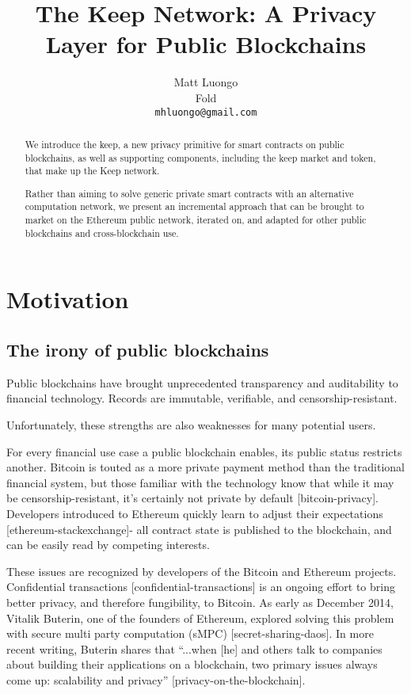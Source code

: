 \documentclass[11pt]{article}
\title{The Keep Network: A Privacy Layer for Public Blockchains}
\author{Matt Luongo \\
  Fold \\
  {\tt mhluongo@gmail.com}}
\date{}
\begin{document}
\maketitle
\begin{abstract}
  We introduce the keep, a new privacy primitive for smart contracts
  on public blockchains, as well as supporting components, including
  the keep market and token, that make up the Keep network.

  Rather than aiming to solve generic private smart contracts with an
  alternative computation network, we present an incremental approach
  that can be brought to market on the Ethereum public network,
  iterated on, and adapted for other public blockchains and
  cross-blockchain use.
\end{abstract}

\section{Motivation}

\subsection{The irony of public blockchains}

Public blockchains have brought unprecedented transparency and
auditability to financial technology. Records are immutable,
verifiable, and censorship-resistant.

Unfortunately, these strengths are also weaknesses for many potential
users.

For every financial use case a public blockchain enables, its public
status restricts another. Bitcoin is touted as a more private payment
method than the traditional financial system, but those familiar with
the technology know that while it may be censorship-resistant, it’s
certainly not private by default [bitcoin-privacy]. Developers
introduced to Ethereum quickly learn to adjust their expectations
[ethereum-stackexchange]- all contract state is published to the
blockchain, and can be easily read by competing interests.

These issues are recognized by developers of the Bitcoin and Ethereum
projects. Confidential transactions [confidential-transactions] is an
ongoing effort to bring better privacy, and therefore fungibility, to
Bitcoin. As early as December 2014, Vitalik Buterin, one of the
founders of Ethereum, explored solving this problem with secure multi
party computation (sMPC) [secret-sharing-daos]. In more recent
writing, Buterin shares that “...when [he] and others talk to
companies about building their applications on a blockchain, two
primary issues always come up: scalability and privacy”
[privacy-on-the-blockchain].
\end{document}
